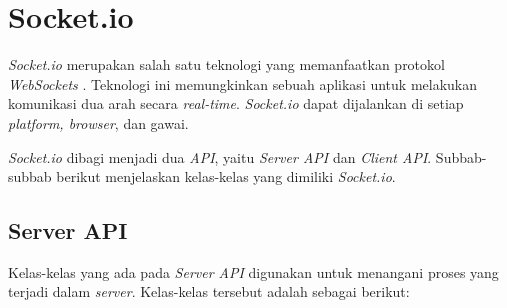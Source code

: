 
\section{Socket.io}
\label{sec:Socket.io}

\textit{Socket.io} merupakan salah satu teknologi yang memanfaatkan protokol \textit{WebSockets} \cite{socketio}. Teknologi ini memungkinkan sebuah aplikasi untuk melakukan komunikasi dua arah secara \textit{real-time}. \textit{Socket.io} dapat dijalankan di setiap \textit{platform, browser}, dan gawai.

\textit{Socket.io} dibagi menjadi dua \textit{API}, yaitu \textit{Server API} dan \textit{Client API}. Subbab-subbab berikut menjelaskan kelas-kelas yang dimiliki \textit{Socket.io}.

\subsection{Server API}
Kelas-kelas yang ada pada \textit{Server API} digunakan untuk menangani proses yang terjadi dalam \textit{server}\cite{socketioserver}. Kelas-kelas tersebut adalah sebagai berikut:

